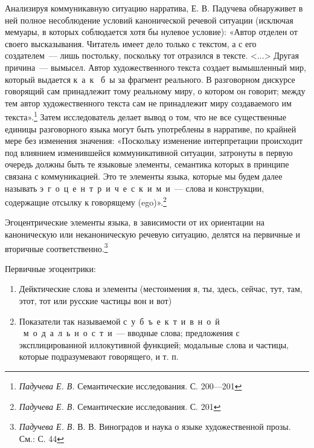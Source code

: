 \documentclass{kursa4}
\begin{document}
      Анализируя коммуникавную ситуацию нарратива, Е. В. Падучева обнаруживет в ней полное несоблюдение условий канонической речевой ситуации (исключая мемуары, в которых соблюдается хотя бы нулевое условие): «Автор отделен от своего высказывания. Читатель имеет дело только с текстом, а с его создателем~--- лишь постольку, поскольку тот отразился в тексте. \textless{}...\textgreater{} Другая причина~--- вымысел. Автор художественного текста создает вымышленный мир, который выдается к~а~к \ б~ы за фрагмент реального. В разговорном дискурсе говорящий сам принадлежит тому реальному миру, о котором он говорит; между тем автор художественного текста сам не принадлежит миру создаваемого им текста».\footnote{\textit{Падучева Е. В. }Семантические исследования. С. 200—201} \newline
       Затем исследователь делает вывод о том, что не все существенные единицы разговорного языка могут быть употреблены в нарративе, по крайней мере без изменения значения: «Поскольку изменение интерпретации происходит под влиянием изменившейся коммуникативной ситуации, затронуты в первую очередь должны быть те языковые элементы, семантика которых в принципе связана с коммуникацией. Это те элементы языка, которые мы будем далее называть э~г~о~ц~е~н~т~р~и~ч~е~с~к~и~м~и~--- слова и конструкции, содержащие отсылку к говорящему (ego)».\footnote{\textit{ Падучева Е. В. }Семантические исследования. С. 201} 

      Эгоцентрические элементы языка, в зависимости от их ориентации на каноническую или неканоническую речевую ситуацию, делятся на первичные и вторичные соответственно.\footnote{\textit{ Падучева Е. В.} В. В. Виноградов и наука о языке художественной прозы. См.: С. 44} 

      Первичные эгоцентрики:

      \begin{enumerate}
        \item Дейктические слова и элементы (местоимения я, ты, здесь, сейчас, тут, там, этот, тот или русские частицы вон и вот) \item Показатели так называемой {с~у~б~ъ~е~к~т~и~в~н~о~й} \ {м~о~д~а~л~ь~н~о~с~т~и}~--- вводные слова; предложения с эксплицированной иллокутивной функцией; модальные слова и частицы, которые подразумевают говорящего, и т. п. \end{enumerate}
\end{document}
